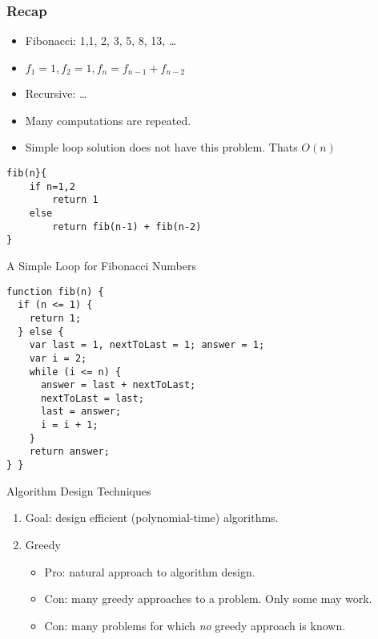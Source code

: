    \begin{frame}[fragile]\frametitle{Recap}
\begin{itemize}
\item Fibonacci: 1,1, 2, 3, 5, 8, 13, \ldots
\item $f_1 = 1, f_2 = 1, f_n = f_{n-1} + f_{n-2}$
\item Recursive: \ldots
\item Many computations are repeated.
\item Simple loop solution does not have this problem. Thats $O(n)$

\end{itemize}

\begin{lstlisting}
fib(n}{
	if n=1,2
		return 1
	else
		return fib(n-1) + fib(n-2)
}
\end{lstlisting}
\end{frame}

   \begin{frame}[fragile]{A Simple Loop for Fibonacci Numbers}


\begin{lstlisting}
function fib(n) {
  if (n <= 1) {
    return 1;
  } else {
    var last = 1, nextToLast = 1; answer = 1; 
    var i = 2;
    while (i <= n) {
      answer = last + nextToLast;
      nextToLast = last;
      last = answer;
      i = i + 1;
    }
    return answer;
} }
\end{lstlisting}
\end{frame}

   \begin{frame}[fragile]{Algorithm Design Techniques}

  \begin{enumerate}
  \item Goal: design efficient (polynomial-time) algorithms.
  \item Greedy
    \begin{itemize}
    \item Pro: natural approach to algorithm design.
    \item Con: many greedy approaches to a problem. Only some may work.
    \item Con: many problems for which \emph{no} greedy approach is known.
    \end{itemize}
  \end{enumerate}
\end{frame}

